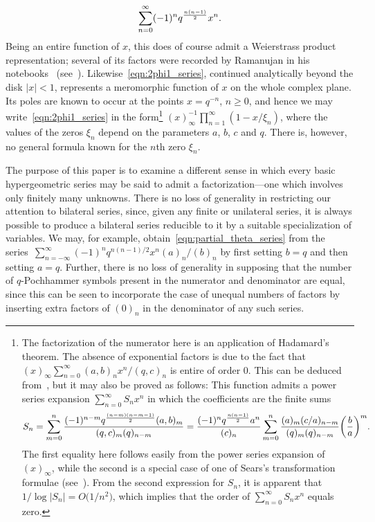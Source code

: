 \documentclass[10pt,a4paper]{amsart}
\numberwithin{equation}{section}
\begin{document}
\begin{equation} \label{eqn:partial_theta_series}
\sum_{n=0}^\infty (-1)^n q^{n(n-1) \over 2} x^n.
\end{equation}
Being an entire function of $x$, this does of course admit a Weierstrass product representation; several of its factors were recorded by Ramanujan in his notebooks~\cite[p.~26]{Ramanujan1988} (see~\cite[pp.~285--286]{Andrews2005}). Likewise~\eqref{eqn:2phi1_series}, continued analytically beyond the disk $|x|<1$, represents a meromorphic function of $x$ on the whole complex plane. Its poles are known to occur at the points $x=q^{-n}$, $n \geq 0$, and hence we may write~\eqref{eqn:2phi1_series} in the form\footnote{The factorization of the numerator here is an application of Hadamard's theorem. The absence of exponential factors is due to the fact that $(x)_\infty \sum_{n=0}^\infty (a,b)_n x^n/(q,c)_n$ is entire of order $0$. This can be deduced from~\cite[equation~(4.3.2)]{Gasper2004}, but it may also be proved as follows: This function admits a power series expansion $\sum_{n=0}^\infty S_n x^n$ in which the coefficients are the finite sums
\[ S_n = \sum_{m=0}^n {(-1)^{n-m} q^{(n-m)(n-m-1) \over 2} (a,b)_m \over (q,c)_m (q)_{n-m}} = {(-1)^n q^{n(n-1) \over 2} a^n \over (c)_n} \sum_{m=0}^n {(a)_m (c/a)_{n-m} \over (q)_m (q)_{n-m}} \bigg( {b \over a} \bigg)^{ m}. \]
The first equality here follows easily from the power series expansion of $(x)_\infty$, while the second is a special case of one of Sears's transformation formulae (see~\cite[equation~(3.2.2)]{Gasper2004}). From the second expression for $S_n$, it is apparent that $1/\log|S_n| = O\bigl(1/n^2\bigr)$, which implies that the order of $\sum_{n=0}^\infty S_n x^n$ equals zero.} $(x)_\infty^{-1}\prod_{n=1}^\infty (1-x/\xi_n)$, where the values of the zeros $\xi_n$ depend on the parameters $a$, $b$, $c$ and $q$. There is, however, no general formula known for the $n$th zero $\xi_n$.

The purpose of this paper is to examine a different sense in which every basic hypergeometric series may be said to admit a factorization---one which involves only finitely many unknowns. There is no loss of generality in restricting our attention to bilateral series, since, given any finite or unilateral series, it is always possible to produce a bilateral series reducible to it by a suitable specialization of variables. We may, for example, obtain~\eqref{eqn:partial_theta_series} from the series~${\sum_{n=-\infty}^\infty (-1)^n q^{n(n-1)/2} x^n (a)_n/(b)_n}$ by first setting $b=q$ and then setting $a=q$. Further, there is no loss of generality in supposing that the number of $q$-Pochhammer symbols present in the numerator and denominator are equal, since this can be seen to incorporate the case of unequal numbers of factors by inserting extra factors of $(0)_n$ in the denominator of any such series.
\end{document}
